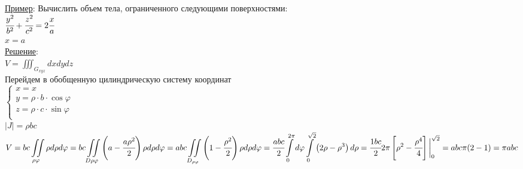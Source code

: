 \underline{Пример}: Вычислить объем тела, ограниченного следующими поверхностями: \\
$\cfrac{y^2}{b^2} + \cfrac{z^2}{c^2} = 2 \cfrac{x}{a}$ \\
$x = a$ \\
\underline{Решение}: \\
$\displaystyle  V = \iiint_{G_{xyz}} dxdydz$ \\
Перейдем в обобщенную цилиндрическую систему координат \\
$\begin{cases}
	x = x \\
	y = \rho \cdot b \cdot \cos{\varphi} \\
	z = \rho \cdot c \cdot \sin{\varphi} \\
\end{cases}$  \\
$|J| = \rho bc$ \\
$\displaystyle  V = bc \iint\limits_{\rho \varphi} \rho d\rho d\varphi = 
bc \iint\limits_{D{\rho \varphi}} \left( a - \cfrac{a\rho^2}{2} \right) \rho d\rho d\varphi = 
abc \iint\limits_{D_{\rho \varphi}} \left( 1 - \cfrac{\rho^2}{2} \right) \rho d\rho d\varphi = 
\cfrac{abc}{2} \int\limits_{0}^{2\pi} d\varphi \int\limits_{0}^{\sqrt{2}} \left( 2\rho - \rho^3 \right) d\rho = 
\cfrac{1bc}{2} 2 \pi \left[ \rho^2 - \cfrac{\rho^4}{4} \right] \bigg|_{0}^{\sqrt{2}} = 
abc \pi (2 - 1) = \pi abc$ \\






















